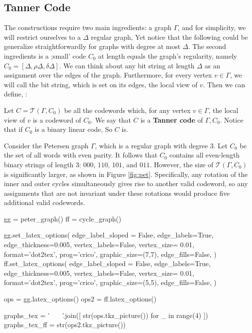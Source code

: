 \subsection{Tanner Code}
The constructions require two main ingredients: a graph $\Gamma$, and for simplicity, we will restrict ourselves to a $\Delta$ regular graph, Yet notice that the following could be generalize straightforwardly for graphs with degree at most $\Delta$. The second ingredients is a ;small' code $C_{0}$ at length equals the graph's regularity, namely $C_{0} = [\Delta,\rho\Delta, \delta\Delta]$. We can think about any bit string at length $\Delta$ as an assignment over the edges of the graph. Furthermore, for every vertex $v \in \Gamma$, we will call the bit string, which is set on its edges, the local view of $v$. Then we can define, \cite{Tanner}:
  \begin{definition}  Let $ C = \mathcal{T}\left( \Gamma, C_{0} \right)$  be all the codewords which, for any vertex $v\in \Gamma$, the local view of $v$ is a codeword of $C_{0}$. We say that $C$ is a \textbf{Tanner code}\label{Tan} of $\Gamma, C_{0}$. Notice that if $C_{0}$ is a binary linear code, So $C$ is.  
  \end{definition}
  \begin{example}
Consider the Petersen graph $\Gamma$, which is a regular graph with degree $3$. Let $C_{0}$ be the set of all words with even parity. It follows that $C_{0}$ contains all even-length binary strings of length $3$: $000$, $110$, $101$, and $011$. However, the size of $\mathcal{T}(\Gamma, C_{0})$ is significantly larger, as shown in Figure \cref{fig:pet}. Specifically, any rotation of the inner and outer cycles simultaneously gives rise to another valid codeword, so any assignments that are not invariant under these rotations would produce five additional valid codewords.

  \end{example}
\begin{sagesilent}
   
  
gg = peter_graph()
ff = cycle_graph()

gg.set_latex_options(
          edge_label_sloped = False,
          edge_labels=True,
          edge_thickness=0.005,
          vertex_labels=False,
          vertex_size= 0.01,
          format='dot2tex',
          prog='crico',
          graphic_size=(7,7),
          edge_fills=False,
      )
ff.set_latex_options(
          edge_label_sloped = False,
          edge_labels=True,
          edge_thickness=0.005,
          vertex_labels=False,
          vertex_size= 0.01,
          format='dot2tex',
          prog='crico',
          graphic_size=(5,5),
          edge_fills=False,
      )
 
ops = gg.latex_options()
ops2 = ff.latex_options()

graphs_tex =  ' \ \ \  '.join([  str(ops.tkz_picture())  for _ in range(4) ])
graphs_tex_ff  = str(ops2.tkz_picture())
\end{sagesilent}

